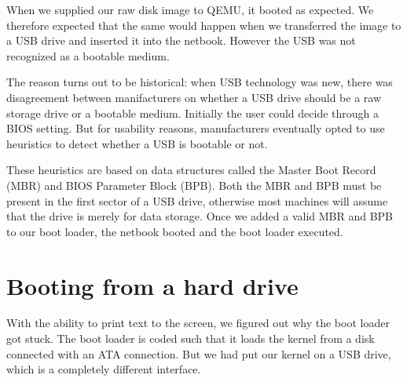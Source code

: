 \documentclass{report}
\begin{document}
When we supplied our raw disk image to QEMU, it booted as expected. We
therefore expected that the same would happen when we transferred the image to
a USB drive and inserted it into the netbook. However the USB was not
recognized as a bootable medium. 

The reason turns out to be historical: when USB technology was new, there was
disagreement between manifacturers on whether a USB drive should be a raw
storage drive or a bootable medium. Initially the user could decide through a
BIOS setting. But for usability reasons, manufacturers eventually opted to use
heuristics to detect whether a USB is bootable or not. 

These heuristics are based on data structures called the Master Boot Record
(MBR) and BIOS Parameter Block (BPB). Both the MBR and BPB must be present in
the first sector of a USB drive, otherwise most machines will assume that the
drive is merely for data storage. Once we added a valid MBR and BPB to our
boot loader, the netbook booted and the boot loader executed.


% 


% 

\section{Booting from a hard drive}
With the ability to print text to the screen, we figured out why the boot
loader got stuck. The boot loader is coded such that it loads the kernel from
a disk connected with an ATA connection. But we had put our kernel on a USB
drive, which is a completely different interface.
\end{document}

